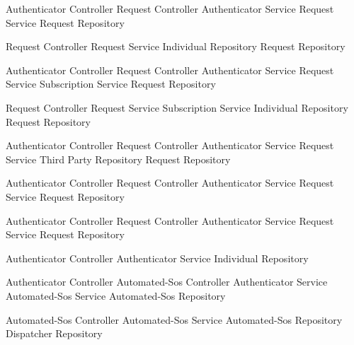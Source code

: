 \documentclass[a4paper]{article}
\begin{document}
\begin{description}
     {Authenticator Controller}
     {Request Controller}
     {Authenticator Service}
     {Request Service}
     {Request Repository}
     
     {Request Controller}
     {Request Service}
     {Individual Repository}
     {Request Repository}
     
     {Authenticator Controller}
     {Request Controller}
     {Authenticator Service}
     {Request Service}
     {Subscription Service}
     {Request Repository}

     {Request Controller}
     {Request Service}
     {Subscription Service}
     {Individual Repository}
     {Request Repository}
     
     {Authenticator Controller}
     {Request Controller}
     {Authenticator Service}
     {Request Service}
     {Third Party Repository}
     {Request Repository}
     
     {Authenticator Controller}
     {Request Controller}
     {Authenticator Service}
     {Request Service}
     {Request Repository}
     
     {Authenticator Controller}
     {Request Controller}
     {Authenticator Service}
     {Request Service}
     {Request Repository}
     
     {Authenticator Controller}
     {Authenticator Service}
     {Individual Repository}
     
     {Authenticator Controller}
     {Automated-Sos Controller}
     {Authenticator Service}
     {Automated-Sos Service}
     {Automated-Sos Repository}
     
     {Automated-Sos Controller}
     {Automated-Sos Service}
     {Automated-Sos Repository}
     {Dispatcher Repository}
     

\end{description}
\end{document}

